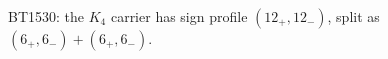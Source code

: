 \begin{center}\small
BT1530: the $K_4$ carrier has sign profile $(12_+,12_-)$, split as $(6_+,6_-)+(6_+,6_-)$.
\end{center}
